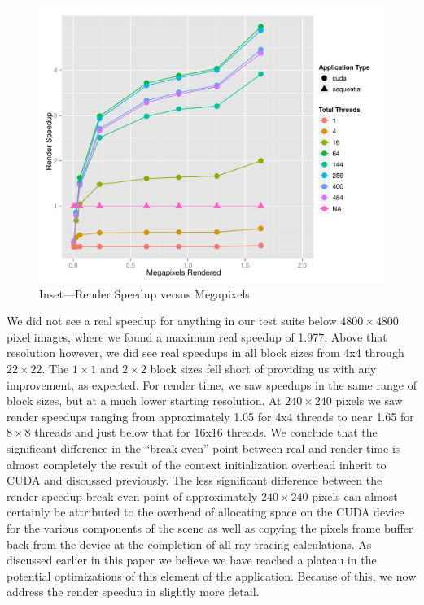 \documentclass[12pt]{article}
\begin{document}
\begin{figure}
    \caption{Inset---Render Speedup versus Megapixels} \label{fig:render_speedup_zoom}
    \begin{center}
\includegraphics{cudatrace-007}
    \end{center}
\end{figure}

We did not see a real speedup for anything in our test suite below $4800 \times 4800$ pixel images, where we found a maximum real speedup of 1.977. Above that resolution however, we did see real speedups in all block sizes from 4x4 through $22 \times 22$. The $1 \times 1$ and $2 \times 2$ block sizes fell short of providing us with any improvement, as expected. For render time, we saw speedups in the same range of block sizes, but at a much lower starting resolution. At $240 \times 240$ pixels we saw render speedups ranging from approximately 1.05 for 4x4 threads to near 1.65 for $8 \times 8$ threads and just below that for 16x16 threads. We conclude that the significant difference in the ``break even'' point between real and render time is almost completely the result of the context initialization overhead inherit to CUDA and discussed previously. The less significant difference between the render speedup break even point of approximately $240 \times 240$ pixels can almost certainly be attributed to the overhead of allocating space on the CUDA device for the various components of the scene as well as copying the pixels frame buffer back from the device at the completion of all ray tracing calculations. As discussed earlier in this paper we believe we have reached a plateau in the potential optimizations of this element of the application. Because of this, we now address the render speedup in slightly more detail.
\end{document}
